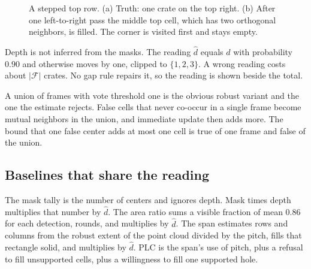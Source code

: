 \documentclass[10pt]{article}
\begin{document}
\begin{figure}[t]
\centering
{}
\caption{A stepped top row. (a) Truth: one crate on the top right. (b) After one left-to-right pass the middle top cell, which has two orthogonal neighbors, is filled. The corner is visited first and stays empty.}
\label{fig:step}
\end{figure}

Depth is not inferred from the masks. The reading $\hat d$ equals $d$ with probability $0.90$ and otherwise moves by one, clipped to $\{1,2,3\}$. A wrong reading costs about $|\mathcal{F}|$ crates. No gap rule repairs it, so the reading is shown beside the total.

A union of frames with vote threshold one is the obvious robust variant and the one the estimate rejects. False cells that never co-occur in a single frame become mutual neighbors in the union, and immediate update then adds more. The bound that one false center adds at most one cell is true of one frame and false of the union.

\subsection{Baselines that share the reading}
The mask tally is the number of centers and ignores depth. Mask times depth multiplies that number by $\hat d$. The area ratio sums a visible fraction of mean $0.86$ for each detection, rounds, and multiplies by $\hat d$. The span estimates rows and columns from the robust extent of the point cloud divided by the pitch, fills that rectangle solid, and multiplies by $\hat d$. PLC is the span's use of pitch, plus a refusal to fill unsupported cells, plus a willingness to fill one supported hole.
\end{document}
